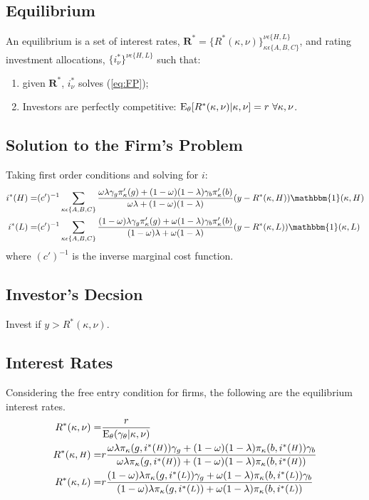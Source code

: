 \documentclass[notitlepage]{article}
\begin{document}
\subsection{Equilibrium}

An equilibrium is a set of interest rates, $\mathbf{R}^{*}=\{ R^{*}(\kappa,\nu)\}_{\kappa\epsilon\{A,B,C\}}^{\nu\epsilon\{H,L\}}$, and rating investment allocations, $\{i^{*}_{\nu}\}^{\nu\epsilon\{H,L\}}$ such that:
\begin{enumerate}
	\item given $\mathbf{R}^{*}$, $i^{*}_{\nu}$ solves (\ref{eq:FP});
	\item Investors are perfectly competitive: $\textup{E}_{\theta} [R^{*}(\kappa,\nu)|\kappa,\nu ] = r \,\, \forall \kappa, \nu$.
\end{enumerate}

\subsection{Solution to the Firm's Problem}
Taking first order conditions and solving for $i$:
\begin{align}
i^{*}(H) = & (c')^{-1}\sum_{\kappa \epsilon \{A,B,C\}} \frac{\omega\lambda\gamma_{g}\pi_{\kappa}'(g)+(1-\omega)(1-\lambda)\gamma_{b}\pi_{\kappa}'(b)}{\omega\lambda+(1-\omega)(1-\lambda)}(y-R^{*}(\kappa,H))\mathbbm{1}(\kappa,H)\\
i^{*}(L) = & (c')^{-1}\sum_{\kappa \epsilon \{A,B,C\}} \frac{(1-\omega)\lambda\gamma_{g}\pi_{\kappa}'(g)+\omega(1-\lambda)\gamma_{b}\pi_{\kappa}'(b)}{(1-\omega)\lambda+\omega(1-\lambda)}(y-R^{*}(\kappa,L))\mathbbm{1}(\kappa,L)
\end{align}
where $(c')^{-1}$ is the inverse marginal cost function.

\subsection{Investor's Decsion}
Invest if $y>R^{*}(\kappa,\nu)$.

\subsection{Interest Rates}
Considering the free entry condition for firms, the following are the equilibrium interest rates.
\begin{align}
R^{*}(\kappa,\nu) = & \frac{r}{\textup{E}_{\theta}(\gamma_{\theta}|\kappa,\nu)}\\
R^{*}(\kappa,\medmath{H}) = & r\frac{\omega\lambda\pi_{\kappa}(g,i^{*}(\medmath{H}))\gamma_{g}+(1-\omega)(1-\lambda)\pi_{\kappa}(b,i^{*}(\medmath{H}))\gamma_{b}}{\omega\lambda\pi_{\kappa}(g,i^{*}(\medmath{H}))+(1-\omega)(1-\lambda)\pi_{\kappa}(b,i^{*}(\medmath{H}))}\\
R^{*}(\kappa,\medmath{L}) = & r\frac{(1-\omega)\lambda\pi_{\kappa}(g,i^{*}(\medmath{L}))\gamma_{g}+\omega(1-\lambda)\pi_{\kappa}(b,i^{*}(\medmath{L}))\gamma_{b}}{(1-\omega)\lambda\pi_{\kappa}(g,i^{*}(\medmath{L}))+\omega(1-\lambda)\pi_{\kappa}(b,i^{*}(\medmath{L}))}
\end{align}
\end{document}
